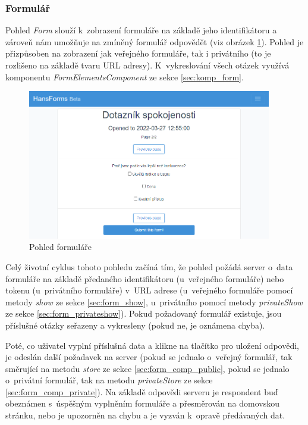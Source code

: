 		\subsubsection{Formulář} %
		Pohled \textit{Form} slouží k~zobrazení formuláře na základě jeho identifikátoru a zároveň nám umožňuje na zmíněný formulář odpovědět (viz obrázek \ref{fig:pohled_form}). Pohled je přizpůsoben na zobrazení jak veřejného formuláře, tak i privátního (to je rozlišeno na základě tvaru URL adresy). K~vykreslování všech otázek využívá komponentu \textit{FormElementsComponent} ze sekce \ref{sec:komp_form}.
		
		\begin{figure}[h]
			\centering
			\includegraphics[width=0.95\textwidth]{img/pohledy/form.png}
			\caption{Pohled formuláře}
			\label{fig:pohled_form}
		\end{figure}
		
		Celý životní cyklus tohoto pohledu začíná tím, že pohled požádá server o~data formuláře na základě předaného identifikátoru (u~veřejného formuláře) nebo tokenu (u~privátního formuláře) v~URL adrese (u~veřejného formuláře pomocí metody \textit{show} ze sekce \ref{sec:form_show}, u~privátního pomocí metody \textit{privateShow} ze sekce \ref{sec:form_privateshow}). Pokud požadovaný formulář existuje, jsou příslušné otázky seřazeny a vykresleny (pokud ne, je oznámena chyba).
		
		Poté, co uživatel vyplní příslušná data a klikne na tlačítko pro uložení odpovědi, je odeslán další požadavek na server (pokud se jednalo o~veřejný formulář, tak směrující na metodu \textit{store} ze sekce \ref{sec:form_comp_public}, pokud se jednalo o~privátní formulář, tak na metodu \textit{privateStore} ze sekce \ref{sec:form_comp_private}). Na základě odpovědi serveru je respondent buď obeznámen s~úspěšným vyplněním formuláře a přesměrován na domovskou stránku, nebo je upozorněn na chybu a je vyzván k~opravě předávaných dat.
		
